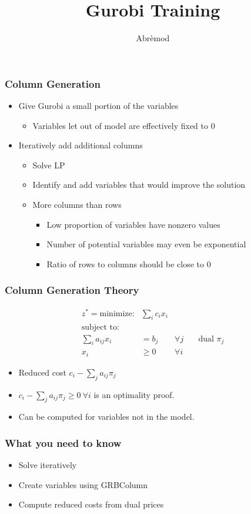 \documentclass[12pt,handout]{beamer}
\title{Gurobi Training}
\author{Abr\`emod}
\begin{document}
\begin{frame}
\frametitle{Column Generation}
\begin{itemize}
  \item Give Gurobi a small portion of the variables
    \begin{itemize}
      \item Variables let out of model are effectively fixed to 0
    \end{itemize}
  \item Iteratively add additional columns
    \begin{itemize}
    \item Solve LP
    \item Identify and add variables that would improve the solution
    \item More columns than rows
    \begin{itemize}
      \item Low proportion of variables have nonzero values
      \item Number of potential variables may even be exponential
      \item Ratio of rows to columns should be close to 0
    \end{itemize}  
    \end{itemize}
\end{itemize}
\end{frame}

\begin{frame}
\frametitle{Column Generation Theory}
\begin{align*}
z^* = \mbox{minimize:} & \sum_i c_i x_i  \\
\mbox{subject to:} \\
\sum_i a_{ij} x_i & = b_j  & \forall j &
 \quad \mbox{dual $\pi_j$} \\
x_i &\ge 0  & \forall i
\end{align*}

\begin{itemize}
\item Reduced cost $c_i - \sum_{j} a_{ij} \pi_j$
\item $c_i - \sum_{j} a_{ij} \pi_j \ge 0 \ \forall i$ is an optimality proof.
\item Can be computed for variables not in the model.
\end{itemize}
\end{frame}

\begin{frame}
\frametitle {What you need to know}
\begin{itemize}
\item Solve iteratively
\item Create variables using GRBColumn
\item Compute reduced costs from dual prices
\end{itemize}
\end{frame}
\end{document}
